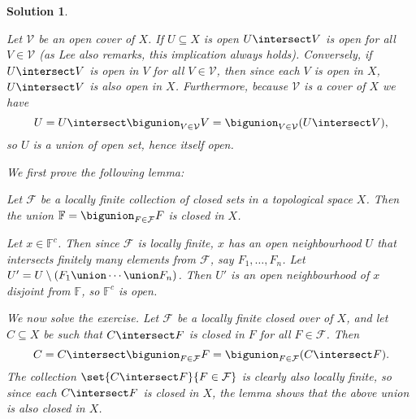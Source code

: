 \documentclass[article, a4paper, 11pt, oneside]{memoir}
\numberwithin{equation}{chapter}
\theoremstyle{nonumberplain}
\newtheorem{solution}{Solution}
\newenvironment{displaytheorem}{%
	\begin{displayquote}\itshape%
}{%
	\end{displayquote}%
}
\newcommand{\calV}{\mathcal{V}}
\newcommand{\calF}{\mathcal{F}}
\newcommand{\bbF}{\mathbb{F}}
\begin{document}
\begin{solution}
\begin{solutionsec}
    \item Let $\calV$ be an open cover of $X$. If $U \subseteq X$ is open $U \intersect V$ is open for all $V \in \calV$ (as Lee also remarks, this implication always holds). Conversely, if $U \intersect V$ is open in $V$ for all $V \in \calV$, then since each $V$ is open in $X$, $U \intersect V$ is also open in $X$. Furthermore, because $\calV$ is a cover of $X$ we have
    \begin{equation*}
        U
            = U \intersect \bigunion_{V \in \calV} V
            = \bigunion_{V \in \calV} (U \intersect V),
    \end{equation*}
    so $U$ is a union of open set, hence itself open.

    \item We first prove the following lemma:
    \begin{displaytheorem}
        Let $\calF$ be a locally finite collection of closed sets in a topological space $X$. Then the union $\bbF = \bigunion_{F \in \calF} F$ is closed in $X$.
    \end{displaytheorem}
    Let $x \in \bbF^c$. Then since $\calF$ is locally finite, $x$ has an open neighbourhood $U$ that intersects finitely many elements from $\calF$, say $F_1, \ldots, F_n$. Let $U' = U \setminus (F_1 \union \cdots \union F_n)$. Then $U'$ is an open neighbourhood of $x$ disjoint from $\bbF$, so $\bbF^c$ is open.
    
    We now solve the exercise. Let $\calF$ be a locally finite closed over of $X$, and let $C \subseteq X$ be such that $C \intersect F$ is closed in $F$ for all $F \in \calF$. Then
    \begin{equation*}
        C
            = C \intersect \bigunion_{F \in \calF} F
            = \bigunion_{F \in \calF} (C \intersect F).
    \end{equation*}
    The collection $\set{C \intersect F}{F \in \calF}$ is clearly also locally finite, so since each $C \intersect F$ is closed in $X$, the lemma shows that the above union is also closed in $X$.
\end{solutionsec}
\end{solution}
\end{document}
